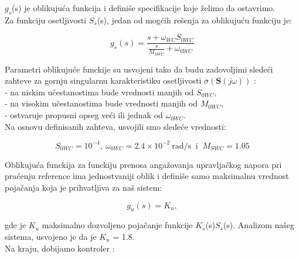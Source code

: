 \documentclass[a4paper,11pt]{article}
\theoremstyle{definition} \newtheorem{deff}{Definicija}[section]
\theoremstyle{definition} \newtheorem{prim}[deff]{Primer}
\theoremstyle{plain} \newtheorem{teor}[deff]{Teorema}
\begin{document}
			$g_s$(s) je oblikujuća funkcija i definiše specifikacije koje želimo da ostavrimo. \\
			
			Za funkciju osetljivosti $S_s$(s), jedan od mogćih rešenja za oblikujuću funkciju je:
			
			\begin{equation}
				g_s(s) = \frac{s + \omega_{WC} S_{0WC}}{\frac{s}{M_{SWC}} + \omega_{0WC}}
			\end{equation}
			\vspace{1cm}
			
			Parametri oblikujuće funckije su usvojeni tako da budu zadovoljimi sledeći zahteve za gornju singularnu karakteristiku osetljivosti $\overline{\sigma}(\textbf{S}(j\omega))$
			: \\
			
			- na niskim učestanostima bude vrednosti manjih od $S_{0WC}$, \\
			
			- na visokim učestanostima bude vrednosti manjih od $M_{0WC}$, \\
			
			- ostvaruje propusni opseg veći ili jednak od $\omega_{0WC}$. \\
			
			Na osnovu definisanih zahteva, usvojili smo sledeće vrednosti:
			
			\begin{equation}
				S_{0WC} = 10^{-4},~ \omega_{0WC} = 2.4 \times 10^{-2} \: \text{rad/s} \: \text{ i } \: M_{SWC} = 1.05 
			\end{equation}
			\vspace{1cm}
			
			Oblikujuća funckija za funckiju prenosa angažovanja upravljačkog napora pri praćenju reference ima jednostvaniji oblik i definiše samo maksimalnu vrednost pojačanja koja je prihvatljiva za naš sistem:
			
			\begin{equation}
				g_u(s) = K_u,
			\end{equation}
			
			\noindent gde je $K_u$ maksimalno dozvoljeno pojačanje funkcije $K_s$(s)$S_s$(s). Analizom našeg sistema, usvojeno je da je $K_u$ = 1.8. \\
			
			\vspace{1cm}
			Na kraju, dobijamo kontroler :
			
\end{document}
